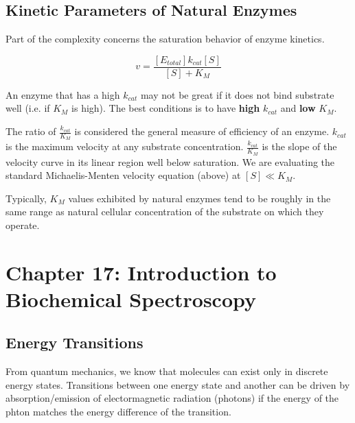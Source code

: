 \documentclass[12pt, letterpaper]{article}
\begin{document}
\subsection*{Kinetic Parameters of Natural Enzymes}
Part of the complexity concerns the saturation behavior of enzyme kinetics. 

\begin{equation*}
    v = \frac{[E_{total}] k_{cat}[S]}{[S] + K_M}
\end{equation*}

An enzyme that has a high $k_{cat}$ may not be great if it does not bind substrate well (i.e. if $K_M$ is high). 
The best conditions is to have \textbf{high} $k_{cat}$ and \textbf{low} $K_M$. 

The ratio of $\frac{k_{cat}}{K_M}$ is considered the general measure of efficiency of an enzyme. $k_{cat}$ is the maximum velocity at any substrate concentration. 
$\frac{k_{cat}}{K_M}$ is the slope of the velocity curve in its linear region well below saturation. We are evaluating the standard Michaelis-Menten velocity equation (above) at $[S] \ll K_M$. 

Typically, $K_M$ values exhibited by natural enzymes tend to be roughly in the same range as natural cellular concentration of the substrate on which they operate. 

\newpage
\section*{Chapter 17: Introduction to Biochemical Spectroscopy}

\subsection*{Energy Transitions}

From quantum mechanics, we know that molecules can exist only in discrete energy states. Transitions between one energy state and another 
can be driven by absorption/emission of electormagnetic radiation (photons) if the energy of the phton matches the energy difference of the 
transition. 
\end{document}
